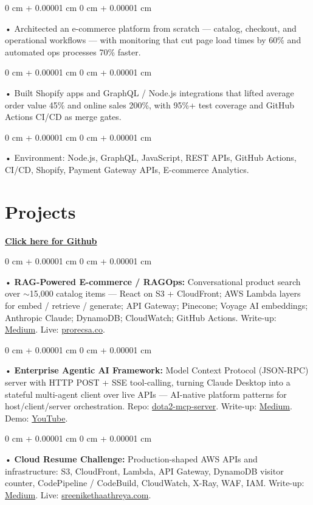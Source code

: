 \documentclass[10pt, letterpaper]{article}
\newenvironment{onecolentry}{
    \begin{adjustwidth}{
        0 cm + 0.00001 cm
    }{
        0 cm + 0.00001 cm
    }
}{
    \end{adjustwidth}
} %
\begin{document}
        \begin{onecolentry}
             • Architected an e-commerce platform from scratch --- catalog, checkout, and operational workflows --- with monitoring that cut page load times by 60\% and automated ops processes 70\% faster.
        \end{onecolentry}
        \begin{onecolentry}
             • Built Shopify apps and GraphQL / Node.js integrations that lifted average order value 45\% and online sales 200\%, with 95\%+ test coverage and GitHub Actions CI/CD as merge gates.
        \end{onecolentry}
        \begin{onecolentry}
             • Environment: Node.js, GraphQL, JavaScript, REST APIs, GitHub Actions, CI/CD, Shopify, Payment Gateway APIs, E-commerce Analytics.
        \end{onecolentry}

        \vspace{0.4cm}
\section{Projects}
    \vspace{2 pt}
\textbf{\href{https://github.com/daedalus-s}{Click here for Github}}
\begin{onecolentry}
     • \textbf{RAG-Powered E-commerce / RAGOps:} Conversational product search over $\sim$15,000 catalog items --- React on S3 + CloudFront; AWS Lambda layers for embed / retrieve / generate; API Gateway; Pinecone; Voyage AI embeddings; Anthropic Claude; DynamoDB; CloudWatch; GitHub Actions. Write-up: \href{https://medium.com/@sreenikethaathreya/from-rags-to-riches-bba8a671d5e6}{Medium}. Live: \href{https://prorecsa.co}{prorecsa.co}.
\end{onecolentry}
\begin{onecolentry}
     • \textbf{Enterprise Agentic AI Framework:} Model Context Protocol (JSON-RPC) server with HTTP POST + SSE tool-calling, turning Claude Desktop into a stateful multi-agent client over live APIs --- AI-native platform patterns for host/client/server orchestration. Repo: \href{https://github.com/daedalus-s/dota2-mcp-server}{dota2-mcp-server}. Write-up: \href{https://medium.com/@sreenikethaathreya/get-good-at-using-ai-noob-5d2576203112}{Medium}. Demo: \href{https://www.youtube.com/watch?v=op2gTYyFb5U}{YouTube}.
\end{onecolentry}
\begin{onecolentry}
     • \textbf{Cloud Resume Challenge:} Production-shaped AWS APIs and infrastructure: S3, CloudFront, Lambda, API Gateway, DynamoDB visitor counter, CodePipeline / CodeBuild, CloudWatch, X-Ray, WAF, IAM. Write-up: \href{https://medium.com/@sreenikethaathreya/cloud-resume-challenge-c4f17c3d53ff}{Medium}. Live: \href{https://sreenikethaathreya.com}{sreenikethaathreya.com}.
\end{onecolentry}
\vspace{2 pt}
        \vspace{2 pt }
\end{document}
